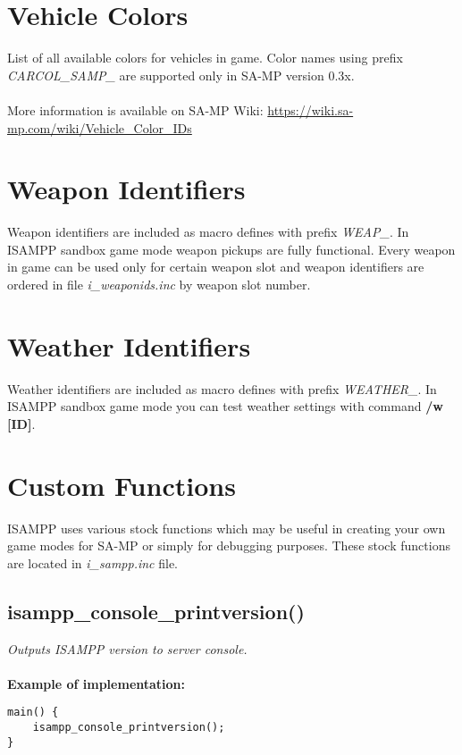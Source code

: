 \documentclass{article}
\begin{document}
\section{Vehicle Colors}
List of all available colors for vehicles in game. Color names using prefix \textit{CARCOL\_SAMP\_} are supported only in SA-MP version 0.3x.
\\
\\More information is available on SA-MP Wiki: \url{https://wiki.sa-mp.com/wiki/Vehicle_Color_IDs}

\section{Weapon Identifiers}
Weapon identifiers are included as macro defines with prefix \textit{WEAP\_}. In ISAMPP sandbox game mode weapon pickups are fully functional. Every weapon in game can be used only for certain weapon slot and weapon identifiers are ordered in file \textit{i\_weaponids.inc} by weapon slot number.

\section{Weather Identifiers}
Weather identifiers are included as macro defines with prefix \textit{WEATHER\_}. In ISAMPP sandbox game mode you can test weather settings with command \textbf{/w [ID]}.


\newpage
\section{Custom Functions}

ISAMPP uses various stock functions which may be useful in creating your own game modes for SA-MP or simply for debugging purposes. These stock functions are located in \textit{i\_sampp.inc} file.
\\
\subsection{isampp\_console\_printversion()}

\textit{Outputs ISAMPP version to server console.}
\\
\\
\textbf{Example of implementation:}
\begin{verbatim}
main() {
    isampp_console_printversion();
}
\end{verbatim}
\end{document}
